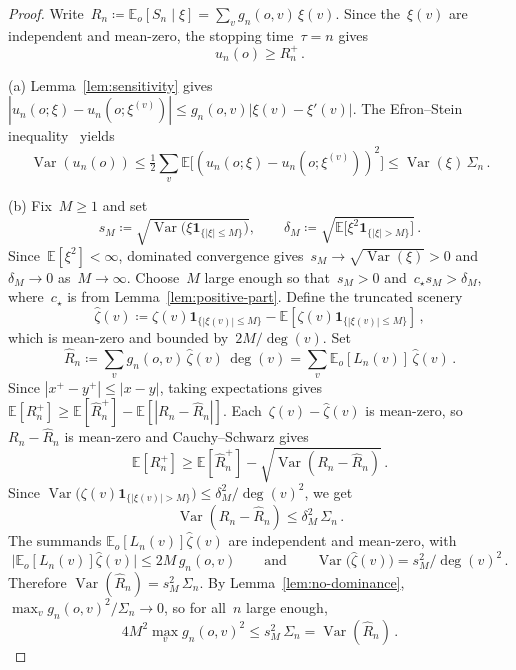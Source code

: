 \documentclass[aop]{imsart}
\theoremstyle{plain}
\theoremstyle{definition}
\newcommand{\E}{\mathbb{E}}
\newcommand{\one}{\mathbf{1}}
\DeclareMathOperator{\var}{Var}
\begin{document}
	\begin{proof}
		Write~$R_n\coloneqq\E_o[S_n\mid\xi]=\sum_v g_n(o,v)\,\xi(v)$.
		Since the~$\xi(v)$ are independent and mean-zero, the stopping time~$\tau=n$ gives
		\begin{equation}\label{eq:un-geq-Rn+}
			u_n(o)\geq R_n^+\,.
		\end{equation}
		
		\medskip
		\textup{(a)}\;
		Lemma~\ref{lem:sensitivity} gives~$|u_n(o;\xi)-u_n(o;\xi^{(v)})|\leq g_n(o,v)|\xi(v)-\xi'(v)|$.
		The Efron--Stein inequality~\citep{EfronStein81} yields
		\[
		\var(u_n(o))\leq\tfrac{1}{2}\sum_v\E\bigl[(u_n(o;\xi)-u_n(o;\xi^{(v)}))^2\bigr]
		\leq\var(\xi)\,\Sigma_n\,.
		\]
		
		\medskip
		\textup{(b)}\;
		Fix~$M\geq 1$ and set
		\[
		s_M \coloneqq \sqrt{\var\bigl(\xi\one_{\{|\xi|\leq M\}}\bigr)},\qquad \delta_M \coloneqq \sqrt{\E\bigl[\xi^2\one_{\{|\xi|>M\}}\bigr]}\,.
		\]
		Since~$\E[\xi^2]<\infty$, dominated convergence gives~$s_M\to\sqrt{\var(\xi)}>0$ and~$\delta_M\to 0$ as~$M\to\infty$. Choose~$M$ large enough so that~$s_M>0$ and~$c_\star s_M>\delta_M$, where~$c_\star$ is from Lemma~\ref{lem:positive-part}.
		Define the truncated scenery
		\[
		\hat\zeta(v)\coloneqq\zeta(v)\one_{\{|\xi(v)|\leq M\}}-\E[\zeta(v)\one_{\{|\xi(v)|\leq M\}}]\,,
		\]
		which is mean-zero and bounded by~$2M/\deg(v)$. Set
		\[
		\hat R_n\coloneqq\sum_v g_n(o,v)\,\hat\zeta(v)\,\deg(v)=\sum_v\E_o[L_n(v)]\,\hat\zeta(v)\,.
		\]
		Since $|x^+-y^+|\leq|x-y|$, taking expectations gives $\E[R_n^+]\geq\E[\hat R_n^+]-\E[|R_n-\hat R_n|]$.
		Each~$\zeta(v)-\hat\zeta(v)$ is mean-zero, so $R_n-\hat R_n$ is mean-zero and Cauchy--Schwarz gives
		\begin{equation}\label{eq:trunc-error}
			\E[R_n^+]\geq\E[\hat R_n^+]-\sqrt{\var(R_n-\hat R_n)}\,.
		\end{equation}
		Since $\var\bigl(\zeta(v)\one_{\{|\xi(v)|>M\}}\bigr)\leq\delta_M^2/\deg(v)^2$, we get
		\begin{equation}\label{eq:trunc-var}
			\var(R_n-\hat R_n)
			\leq\delta_M^2\,\Sigma_n\,.
		\end{equation}
		The summands $\E_o[L_n(v)]\hat\zeta(v)$ are independent and mean-zero, with
		\[
		\bigl|\E_o[L_n(v)]\hat\zeta(v)\bigr|\leq 2M\,g_n(o,v)
		\qquad\text{and}\qquad
		\var\bigl(\hat\zeta(v)\bigr)=s_M^2/\deg(v)^2\,.
		\]
		Therefore $\var(\hat R_n)=s_M^2\,\Sigma_n$.
		By Lemma~\ref{lem:no-dominance}, $\max_v g_n(o,v)^2/\Sigma_n\to 0$, so for all~$n$ large enough,
		\[
		4M^2\max_vg_n(o,v)^{\!2}\leq s_M^2\,\Sigma_n=\var(\hat R_n)\,.
\]
\end{proof}
\end{document}
